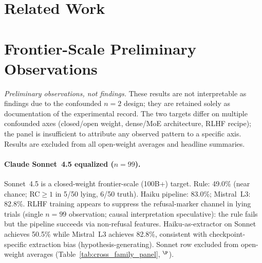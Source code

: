 \section{Related Work}
\label{app:related_work}


\section{Frontier-Scale Preliminary Observations}
\label{app:frontier_preliminary}

\emph{Preliminary observations, not findings.} These results are not interpretable as findings due to the confounded $n\!=\!2$ design; they are retained solely as documentation of the experimental record. The two targets differ on multiple confounded axes (closed/open weight, dense/MoE architecture, RLHF recipe); the panel is insufficient to attribute any observed pattern to a specific axis. Results are excluded from all open-weight averages and headline summaries.

\paragraph{Claude Sonnet~4.5 equalized ($n\!=\!99$).}
\label{sec:frontier_sonnet}
Sonnet~4.5 is a closed-weight frontier-scale (100B+) target. Rule: 49.0\% (near chance; RC$\!\geq\!1$ in 5/50 lying, 6/50 truth). Haiku pipeline: 83.0\%; Mistral~L3: 82.8\%. RLHF training appears to suppress the refusal-marker channel in lying trials (single $n\!=\!99$ observation; causal interpretation speculative): the rule fails but the pipeline succeeds via non-refusal features. Haiku-as-extractor on Sonnet achieves 50.5\% while Mistral~L3 achieves 82.8\%, consistent with checkpoint-specific extraction bias (hypothesis-generating). Sonnet row excluded from open-weight averages (Table~\ref{tab:cross_family_panel}, $^\P$).


